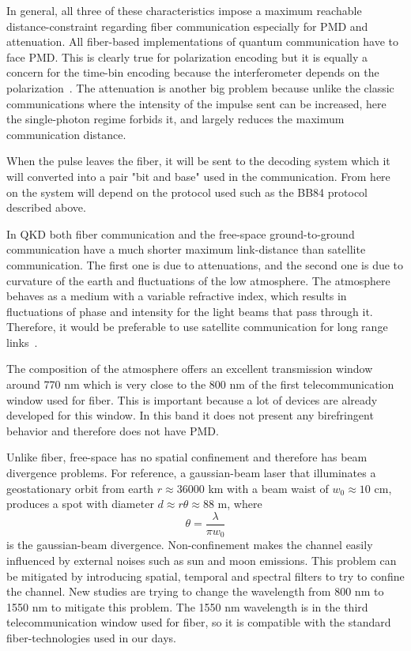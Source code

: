 In general, all three of these characteristics impose a maximum reachable distance-constraint regarding fiber communication especially for PMD and attenuation. All fiber-based implementations of quantum communication have to face PMD. This is clearly true for polarization encoding but it is equally a concern for the time-bin encoding because the interferometer depends on the polarization~\cite{a25}. The attenuation is another big problem because unlike the classic communications where the intensity of the impulse sent can be increased, here the single-photon regime forbids it, and largely reduces the maximum communication distance.

When the pulse leaves the fiber, it will be sent to the decoding system which it will converted into a pair "bit and base" used in the communication. From here on the system will depend on the protocol used such as the BB84 protocol described above.


In QKD both fiber communication and the free-space ground-to-ground communication have a much shorter maximum link-distance than satellite communication. The first one is due to attenuations, and the second one is due to curvature of the earth and fluctuations of the low atmosphere. The atmosphere behaves as a medium with a variable refractive index, which results in fluctuations of phase and intensity for the light beams that pass through it. Therefore, it would be preferable to use satellite communication for long range links~\cite{a14}.

The composition of the atmosphere offers an excellent transmission window around 770 nm which is very close to the 800 nm of the first telecommunication window used for fiber. This is important because a lot of devices are already developed for this window. In this band it does not present any birefringent behavior and therefore does not have PMD.

Unlike fiber, free-space has no spatial confinement and therefore has beam divergence problems. For reference, a gaussian-beam laser that illuminates a geostationary orbit from earth $r \approx 36000$ km with a beam waist of $w_0 \approx 10$ cm, produces a spot with diameter $d \approx r \theta \approx 88$ m, where
\begin{equation}
  \theta = \frac{\lambda}{\pi w_0}
\end{equation}
is the gaussian-beam divergence. Non-confinement makes the channel easily influenced by external noises such as sun and moon emissions. This problem can be mitigated by introducing spatial, temporal and spectral filters to try to confine the channel. New studies are trying to change the wavelength from 800 nm to 1550 nm to mitigate this problem. The 1550 nm wavelength is in the third telecommunication window used for fiber, so it is compatible with the standard fiber-technologies used in our days.

